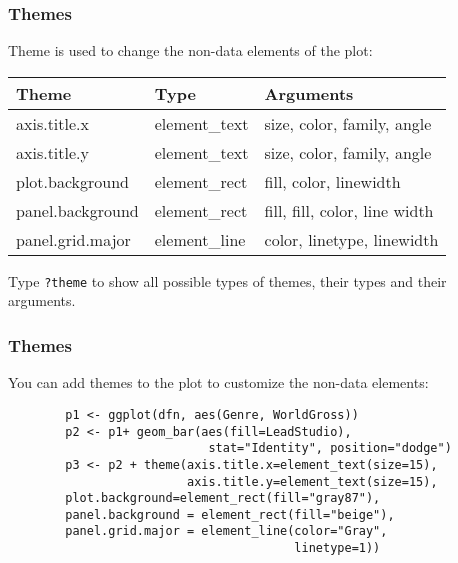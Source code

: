 \documentclass{beamer}
\begin{document}
	\begin{frame}[fragile]
		\frametitle{Themes}

		Theme is used to change the non-data elements of the plot:

		\begin{center}
		\begin{tabular}{|l|l|l|}
		\hline
    		Theme & Type & Arguments \\ 
		\hline
		axis.title.x & element\_text & size, color, family, angle \\
		\hline
		axis.title.y & element\_text & size, color, family, angle \\
		\hline
		plot.background & element\_rect & fill, color, linewidth \\
		\hline
		panel.background & element\_rect & fill, fill, color, line width \\
		\hline
		panel.grid.major & element\_line & color, linetype, linewidth \\
		\hline
		\end{tabular}
		\end{center}

		Type \verb|?theme| to show all possible types of themes, their types and their arguments.

	\end{frame}

	\begin{frame}[fragile]
		\frametitle{Themes}

		You can add themes to the plot to customize the non-data elements:

		\begin{exampleblock}{}
		\begin{center}
		\begin{BVerbatim}
		p1 <- ggplot(dfn, aes(Genre, WorldGross)) 
		p2 <- p1+ geom_bar(aes(fill=LeadStudio), 
		                    stat="Identity", position="dodge")
		p3 <- p2 + theme(axis.title.x=element_text(size=15),
		                 axis.title.y=element_text(size=15),
		plot.background=element_rect(fill="gray87"),
		panel.background = element_rect(fill="beige"),
		panel.grid.major = element_line(color="Gray",
		                                linetype=1))
		\end{BVerbatim}
		\end{center}
		\end{exampleblock}{}

	\end{frame}
\end{document}
